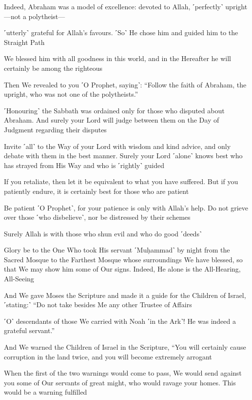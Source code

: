 Indeed, Abraham was a model of excellence: devoted to Allah, ˹perfectly˺ upright—not a polytheist—

˹utterly˺ grateful for Allah’s favours. ˹So˺ He chose him and guided him to the Straight Path

We blessed him with all goodness in this world, and in the Hereafter he will certainly be among the righteous

Then We revealed to you ˹O Prophet, saying˺: “Follow the faith of Abraham, the upright, who was not one of the polytheists.”

˹Honouring˺ the Sabbath was ordained only for those who disputed about Abraham. And surely your Lord will judge between them on the Day of Judgment regarding their disputes

Invite ˹all˺ to the Way of your Lord with wisdom and kind advice, and only debate with them in the best manner. Surely your Lord ˹alone˺ knows best who has strayed from His Way and who is ˹rightly˺ guided

If you retaliate, then let it be equivalent to what you have suffered. But if you patiently endure, it is certainly best for those who are patient

Be patient ˹O Prophet˺, for your patience is only with Allah’s help. Do not grieve over those ˹who disbelieve˺, nor be distressed by their schemes

Surely Allah is with those who shun evil and who do good ˹deeds˺

Glory be to the One Who took His servant ˹Muḥammad˺ by night from the Sacred Mosque to the Farthest Mosque whose surroundings We have blessed, so that We may show him some of Our signs. Indeed, He alone is the All-Hearing, All-Seeing

And We gave Moses the Scripture and made it a guide for the Children of Israel, ˹stating:˺ “Do not take besides Me any other Trustee of Affairs

˹O˺ descendants of those We carried with Noah ˹in the Ark˺! He was indeed a grateful servant.”

And We warned the Children of Israel in the Scripture, “You will certainly cause corruption in the land twice, and you will become extremely arrogant

When the first of the two warnings would come to pass, We would send against you some of Our servants of great might, who would ravage your homes. This would be a warning fulfilled

